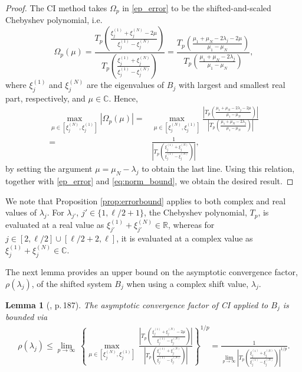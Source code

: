\documentclass{article}
\newtheorem{lem}{Lemma}
\newcommand{\umax}{\mu_{1}}
\newcommand{\umin}{\mu_{\sizeA}}
\newcommand{\sizeA}{N}
\theoremstyle{definition}
\newcommand{\poly}{\Omega}
\begin{document}
{		\begin{proof}
			The CI method takes $\poly_p$ in \eqref{ep_error} to be the shifted-and-scaled Chebyshev polynomial, i.e.
			\begin{equation*}
				{\poly_p(\mu) = \frac{T_p \left( \frac{\xi_j^{(1)} + \xi_j^{(N)} - 2 \mu}{\xi_j^{(1)} - \xi_j^{(N)}} \right)}{T_p \left( \frac{\xi_j^{(1)} + \xi_j^{(N)}}{\xi_j^{(1)} - \xi_j^{(N)}} \right)} =}  \frac{T_p \left(\frac{\umax+\umin-2\lambda_j-2\mu}{\umax-\umin}\right)}{T_p \left(\frac{\umax+\umin-2\lambda_j}{\umax-\umin}\right)},
			\end{equation*}
			where $\xi_j^{(1)}$ and $\xi_j^{(N)}$ are the eigenvalues of $B_j$ with largest and smallest real part, respectively, and $\mu \in \mathbb{C}$.
			Hence,
			\begin{align*}
				\max_{\mu \in [{\xi_j^{(\sizeA)},\xi_j^{(1)}}]} |  \poly_p( \mu) | ={}& \max_{\mu \in [{\xi_j^{(\sizeA)},\xi_j^{(1)}}]} \frac{\left| T_p \left(\frac{\umax+\umin-2\lambda_j-2\mu}{\umax-\umin}\right) \right|}{\left| T_p \left(\frac{\umax+\umin-2\lambda_j}{\umax-\umin}\right) \right|} \\
				={}& \frac{1}{\left|T_p \left( \frac{\xi_j^{(1)} + \xi_j^{(N)}}{\xi_j^{(1)} - \xi_j^{(N)}}  \right)\right|},
			\end{align*}
			by setting the argument {$\mu = \umin- \lambda_j$} to obtain the last line. {Using this relation, together with \eqref{ep_error} and \eqref{eq:norm_bound},
				we obtain the desired result.}
		\end{proof}
		We note that Proposition \ref{prop:errorbound} applies to both complex and real values of $\lambda_j$. For $\lambda_{j'}$, $j'\in \{1,\ell/2+1\}$, the Chebyshev polynomial, $T_p$, is evaluated at a real value as $\xi_{j'}^{(1)}+\xi_{j'}^{(N)}\in\mathbb{R}$, whereas for $j \in [2,\ell/2]\cup[\ell/2+2,\ell]$, it is evaluated at a complex value as $\xi_{j}^{(1)}+\xi_{j}^{(N)}\in\mathbb{C}$.
		
		
		{The next lemma provides an upper bound
			on the asymptotic convergence {factor}, $\rho(\lambda_j)$, of the shifted system $B_j$ when using a complex shift value, $\lambda_j$.}
		
		
		\begin{lem}[\cite{axelsson1996iterative}, p.\,187]\label{lem:asymptoticrate}
			The asymptotic convergence factor of CI applied to $B_j$ is bounded via
			\begin{align}
				\nonumber \rho(\lambda_j) \leq \lim_{p \rightarrow \infty} \, \left\{ \max_{\mu \in [\xi_j^{(\sizeA)},\xi_j^{(1)}]} \, 
				\frac{\left| T_p \left(\frac{{ \xi_j^{(1)}+\xi_j^{(N)} -2\mu}}{\xi_j^{(1)}-\xi_j^{(N)}}\right) \right|}{\left| T_p \left(\frac{\xi_j^{(1)}+\xi_j^{(N)}}{\xi_j^{(1)}-\xi_j^{(N)}}\right) \right|} \right\}^{1/p} 
				= \frac{1}{\lim_{p\rightarrow \infty} \left|T_p \left(\frac{\xi_j^{(1)}+\xi_j^{(N)}}{\xi_j^{(1)}-\xi_j^{(N)}}\right)\right|^{1/p}}.
			\end{align}
			

\end{lem}}
\end{document}
